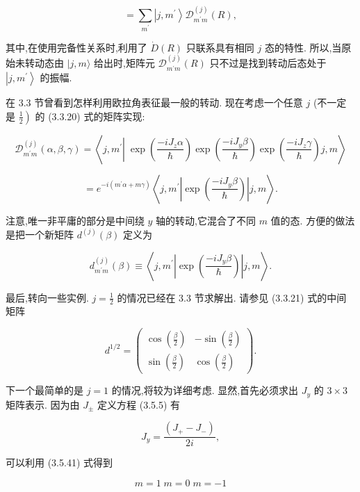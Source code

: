 $$
= \mathop{\sum }\limits_{{m}^{\prime }}\left| {j,{m}^{\prime }}\right\rangle {\mathcal{D}}_{{m}^{\prime }m}^{\left( j\right) }\left( R\right) ,
$$

其中,在使用完备性关系时,利用了 $\dot{D}\left( R\right)$ 只联系具有相同 $j$ 态的特性. 所以,当原始未转动态由 $|j, m\rangle$ 给出时,矩阵元 ${\mathcal{D}}_{{m}^{\prime }m}^{\left( j\right) }\left( R\right)$ 只不过是找到转动后态处于 $\left| {j,{m}^{\prime }}\right\rangle$ 的振幅.

在 3.3 节曾看到怎样利用欧拉角表征最一般的转动. 现在考虑一个任意 $j$ (不一定是 $\left. \frac{1}{2}\right)$ 的 (3.3.20) 式的矩阵实现:

$$
{\mathcal{D}}_{{m}^{\prime }m}^{\left( j\right) }\left( {\alpha ,\beta ,\gamma }\right) = \left\langle {j,{m}^{\prime }\left| {\;\exp \left( \frac{-i{J}_{z}\alpha }{\hslash }\right) \exp \left( \frac{-i{J}_{y}\beta }{\hslash }\right) \exp \left( \frac{-i{J}_{z}\gamma }{\hslash }\right) }\right. j, m}\right\rangle 
$$

$$
= {e}^{-i\left( {{m}^{\prime }\alpha + {m\gamma }}\right) }\left\langle {j,{m}^{\prime }\left| {\exp \left( \frac{-i{J}_{y}\beta }{\hslash }\right) }\right| j, m}\right\rangle .
$$

注意,唯一非平庸的部分是中间绕 $y$ 轴的转动,它混合了不同 $m$ 值的态. 方便的做法是把一个新矩阵 ${d}^{\left( j\right) }\left( \beta \right)$ 定义为

$$
{d}_{{m}^{\prime }m}^{\left( j\right) }\left( \beta \right) \equiv \left\langle {j,{m}^{\prime }\left| {\exp \left( \frac{-i{J}_{y}\beta }{\hslash }\right) }\right| j, m}\right\rangle .
$$

最后,转向一些实例. $j = \frac{1}{2}$ 的情况已经在 3.3 节求解出. 请参见 (3.3.21) 式的中间矩阵

$$
{d}^{1/2} = \left( \begin{matrix} \cos \left( \frac{\beta }{2}\right) & - \sin \left( \frac{\beta }{2}\right) \\ \sin \left( \frac{\beta }{2}\right) & \cos \left( \frac{\beta }{2}\right) \end{matrix}\right) .
$$

下一个最简单的是 $j = 1$ 的情况,将较为详细考虑. 显然,首先必须求出 ${J}_{y}$ 的 $3 \times 3$ 矩阵表示. 因为由 ${J}_{ \pm }$ 定义方程 (3.5.5) 有

$$
{J}_{y} = \frac{\left( {J}_{ + } - {J}_{ - }\right) }{2i},
$$

可以利用 (3.5.41) 式得到

$$
m = 1\;m = 0\;m = - 1
$$

